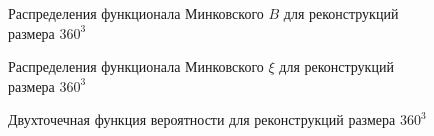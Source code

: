 			\begin{figure}[h]
				\begin{minipage}[h]{0.49\linewidth}
				\end{minipage}
				\hfill
				\begin{minipage}[h]{0.49\linewidth}
				\end{minipage}
				\caption{Распределения функционала Минковского $B$ для реконструкций размера $360^3$}
				\label{5-dist-B-360}
			\end{figure}
			
			\begin{figure}[h]
				\begin{minipage}[h]{0.49\linewidth}
				\end{minipage}
				\hfill
				\begin{minipage}[h]{0.49\linewidth}
				\end{minipage}
				\caption{Распределения функционала Минковского $\xi$ для реконструкций размера $360^3$}
				\label{5-dist-Xi-360}
			\end{figure}
		
			\begin{figure}[h]
				\begin{minipage}[h]{0.49\linewidth}
				\end{minipage}
				\hfill
				\begin{minipage}[h]{0.49\linewidth}
				\end{minipage}
				\caption{Двухточечная функция вероятности для реконструкций размера $360^3$}
				\label{5-prob-360}
			\end{figure}
			
